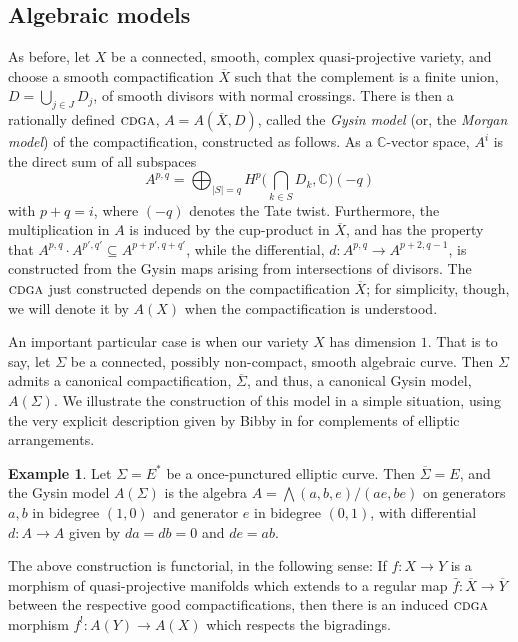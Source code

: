 \documentclass{article}
\numberwithin{equation}{section}
\theoremstyle{definition}
\newtheorem{example}[theorem]{Example}
\renewcommand{\C}{\mathbb{C}}
\newcommand{\cdga}{\ensuremath{\textsc{cdga}}}
\newcommand{\abs}[1]{\left| #1 \right|}
\begin{document}
\subsection{Algebraic models}
\label{subsec:gysin}

As before, let $X$ be a connected, smooth, complex quasi-projective 
variety, and  choose a smooth compactification  $\overline{X}$ such that 
the complement is a finite union, $D=\bigcup_{j\in J} D_j$, 
of smooth divisors with normal crossings.
There is then a rationally defined $\cdga$, 
$A=A(\overline{X}, D)$, called the {\em Gysin model}\/ (or, the 
{\em Morgan model}) of the compactification, constructed as follows.
As a $\C$-vector space, $A^i$ is the direct sum 
of all subspaces 
\begin{equation}
\label{eq:gysin}
A^{p,q}= \bigoplus_{\abs{S} =q} 
H^p \Big(\bigcap_{k\in S} D_k, \C\Big)(-q)
\end{equation}
with $p+q=i$, where $(-q)$ denotes the Tate twist. 
Furthermore, the multiplication in $A$ 
is induced by the cup-product in $\overline{X}$, and has the property that 
$A^{p,q} \cdot A^{p',q'} \subseteq A^{p+p',q+q'}$, while the differential, 
$d \colon A^{p,q} \to A^{p+2, q-1}$, is constructed from the 
Gysin maps arising from intersections of divisors. 
The $\cdga$ just constructed depends on the compactification 
$\overline{X}$; for simplicity, though, we will denote it by $A(X)$ 
when the compactification is understood. 

An important particular case 
is when our variety $X$ has dimension $1$. That is to say, let $\Sigma$ 
be a connected, possibly non-compact, smooth algebraic curve.  
Then $\Sigma$ admits a canonical compactification,  
$\overline{\Sigma}$, and thus, a canonical Gysin model, 
$A (\Sigma)$. We illustrate the construction of this model 
in a simple situation, using the very explicit description 
given by Bibby in \cite{Bi16} for complements of elliptic 
arrangements.

\begin{example}
\label{ex:elliptic gysin}
Let $\Sigma=E^{*}$ be a once-punctured 
elliptic curve.  Then $\overline{\Sigma}=E$, and the Gysin 
model $A (\Sigma)$ is the algebra $A=\bigwedge(a,b,e)/(ae, be)$ 
on generators $a,b$ in bidegree $(1,0)$ and 
generator $e$ in bidegree $(0,1)$, with differential 
$d\colon A\to A$ given by $d{a}=d{b}=0$ and $d{e}=ab$. 
\end{example}

The above construction is functorial, in the following sense: 
If $f\colon X\to Y$ is a morphism of quasi-projective manifolds 
which extends to a regular map $\bar{f}\colon \overline{X}\to \overline{Y}$ 
between the respective good compactifications, then there is an induced 
$\cdga$ morphism $f^{!}\colon A(Y)\to A(X)$ which respects the bigradings. 
\end{document}
